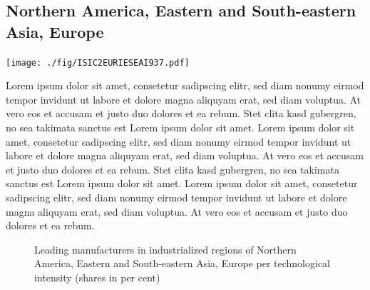 \documentclass[
  openany, nofonts]{tufte-book}
\begin{document}
\hypertarget{northern-america-eastern-and-south-eastern-asia-europe}{%
\subsection{Northern America, Eastern and South-eastern Asia, Europe}\label{northern-america-eastern-and-south-eastern-asia-europe}}

\begin{marginfigure}
\texttt{[image: ./fig/ISIC2EURIESEAI937.pdf]} \end{marginfigure}

Lorem ipsum dolor sit amet, consetetur sadipscing elitr, sed diam nonumy eirmod tempor invidunt ut labore et dolore magna aliquyam erat, sed diam voluptua. At vero eos et accusam et justo duo dolores et ea rebum. Stet clita kasd gubergren, no sea takimata sanctus est Lorem ipsum dolor sit amet. Lorem ipsum dolor sit amet, consetetur sadipscing elitr, sed diam nonumy eirmod tempor invidunt ut labore et dolore magna aliquyam erat, sed diam voluptua. At vero eos et accusam et justo duo dolores et ea rebum. Stet clita kasd gubergren, no sea takimata sanctus est Lorem ipsum dolor sit amet. Lorem ipsum dolor sit amet, consetetur sadipscing elitr, sed diam nonumy eirmod tempor invidunt ut labore et dolore magna aliquyam erat, sed diam voluptua. At vero eos et accusam et justo duo dolores et ea rebum.

\vspace*{\fill}

\begin{figure}
\newline{}\caption[Leading manufacturers in industrialized regions of Northern America, Eastern and South-eastern Asia, Europe per technological intensity (shares in per cent)]{Leading manufacturers in industrialized regions of Northern America, Eastern and South-eastern Asia, Europe per technological intensity (shares in per cent)}\label{fig:c05-indshareINDsub1slope}
\end{figure}

\clearpage\pagebreak
\end{document}
